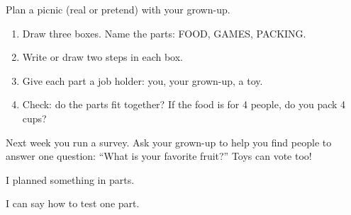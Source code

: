 
\begin{playathome}
Plan a picnic (real or pretend) with your grown-up.
\begin{enumerate}[leftmargin=1.4em,itemsep=2pt]
  \item Draw three boxes. Name the parts: FOOD, GAMES, PACKING.
  \item Write or draw two steps in each box.
  \item Give each part a job holder: you, your grown-up, a toy.
  \item Check: do the parts fit together? If the food is for 4 people, do you pack 4 cups?
\end{enumerate}
\end{playathome}

\begin{playathome}
Next week you run a survey. Ask your grown-up to help you find people to answer one question: \enquote{What is your favorite fruit?} Toys can vote too!
\end{playathome}

\begin{selfcheck}
  \item I planned something in parts.
  \item I can say how to test one part.
\end{selfcheck}
